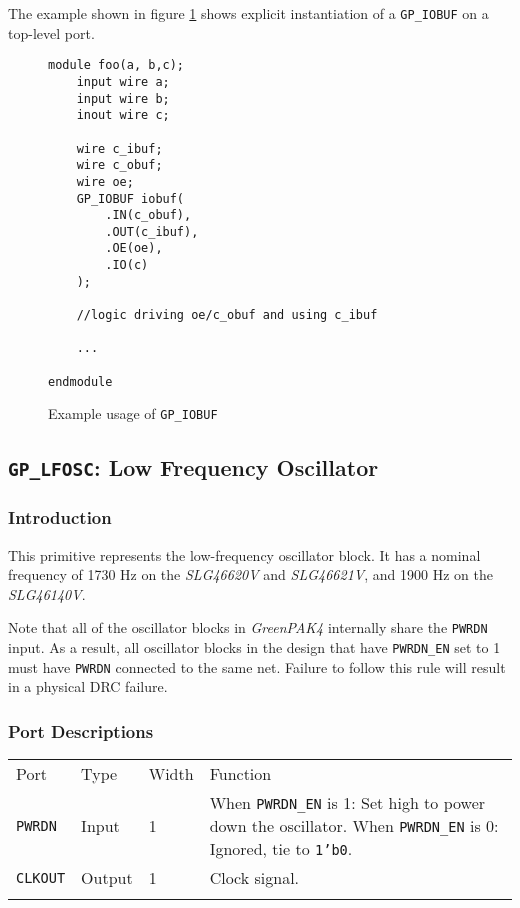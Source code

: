 \documentclass[11pt]{article}
\newcommand{\namestyle}[1]{\textit{#1}}
\newcommand{\tokenstyle}[1]{\texttt{#1}}
\newcommand{\datastyle}[1]{\texttt{#1}}
\newcommand{\whenstyle}[1]{{\fontseries{sb}\selectfont#1}}
\newcommand{\thinhline}{\Xhline{1\arrayrulewidth}}
\newcommand{\thickhline}{\Xhline{2.5\arrayrulewidth}}
\begin{document}
The example shown in figure \ref{gp-iobuf-example} shows explicit instantiation of a \tokenstyle{GP\_IOBUF} on a top-level port.

\begin{figure}[h]
\begin{lstlisting}
module foo(a, b,c);
	input wire a;
	input wire b;
	inout wire c;

	wire c_ibuf;
	wire c_obuf;
	wire oe;
	GP_IOBUF iobuf(
		.IN(c_obuf),
		.OUT(c_ibuf),
		.OE(oe),
		.IO(c)
	);

	//logic driving oe/c_obuf and using c_ibuf

	...

endmodule
\end{lstlisting}
\caption{Example usage of \tokenstyle{GP\_IOBUF}}
\label{gp-iobuf-example}
\end{figure}


\pagebreak
\subsection{\tokenstyle{GP\_LFOSC}: Low Frequency Oscillator}
\label{gp-lfosc}

\subsubsection{Introduction}
This primitive represents the low-frequency oscillator block. It has a nominal frequency of 1730 Hz on the
\namestyle{SLG46620V} and \namestyle{SLG46621V}, and 1900 Hz on the \namestyle{SLG46140V}.

Note that all of the oscillator blocks in \namestyle{GreenPAK4} internally share the \tokenstyle{PWRDN} input. As a result, all oscillator
blocks in the design that have \tokenstyle{PWRDN\_EN} set to 1 must have \tokenstyle{PWRDN} connected to the same net. Failure to follow this
rule will result in a physical DRC failure.

\subsubsection{Port Descriptions}

\begin{tabularx}{\textwidth}{lllX}
\thinhline
\whenstyle{Port} & \whenstyle{Type} & \whenstyle{Width} & \whenstyle{Function} \\
\thickhline
\tokenstyle{PWRDN} & Input & 1 &
	\whenstyle{When \tokenstyle{PWRDN\_EN} is 1:} Set high to power down the oscillator. \newline
	\whenstyle{When \tokenstyle{PWRDN\_EN} is 0:} Ignored, tie to \datastyle{1'b0}.\\
\thinhline
\tokenstyle{CLKOUT} & Output & 1 & Clock signal. \\
\thinhline
\end{tabularx}
\end{document}
